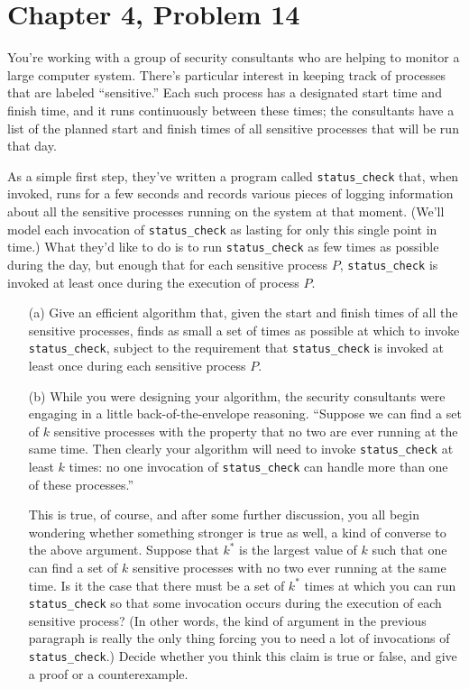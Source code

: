 \documentclass[12pt,letterpaper]{article}
\begin{document}
\section*{Chapter 4, Problem 14}
You're working with a group of security consultants who are helping to
monitor a large computer system. There's particular interest in keeping
track of processes that are labeled ``sensitive.'' Each such process has a
designated start time and finish time, and it runs continuously between
these times; the consultants have a list of the planned start and finish
times of all sensitive processes that will be run that day.

As a simple first step, they've written a program called \texttt{status\_check}
that, when invoked, runs for a few seconds and records various pieces
of logging information about all the sensitive processes running on the
system at that moment. (We'll model each invocation of \texttt{status\_check}
as lasting for only this single point in time.) What they'd like to do is to
run \texttt{status\_check} as few times as possible during the day, but enough
that for each sensitive process $P$, \texttt{status\_check} is invoked at least once
during the execution of process $P$.

\begin{itemize}
\item[(a)] Give an efficient algorithm that, given the start and finish times of
all the sensitive processes, finds as small a set of times as possible
at which to invoke \texttt{status\_check}, subject to the requirement
that \texttt{status\_check} is invoked at least once during each sensitive
process $P$.
\item[(b)] While you were designing your algorithm, the security consultants
were engaging in a little back-of-the-envelope reasoning. ``Suppose
we can find a set of $k$ sensitive processes with the property that no
two are ever running at the same time. Then clearly your algorithm
will need to invoke \texttt{status\_check} at least $k$ times: no one invocation
of \texttt{status\_check} can handle more than one of these processes.''

This is true, of course, and after some further discussion, you all
begin wondering whether something stronger is true as well, a kind
of converse to the above argument. Suppose that $k^*$ is the largest
value of $k$ such that one can find a set of $k$ sensitive processes with
no two ever running at the same time. Is it the case that there must
be a set of $k^*$ times at which you can run \texttt{status\_check} so that some
invocation occurs during the execution of each sensitive process? (In
other words, the kind of argument in the previous paragraph is really
the only thing forcing you to need a lot of invocations of
\texttt{status\_check}.) Decide whether you think this claim is true or false, and give
a proof or a counterexample.
\end{itemize}
\end{document}
